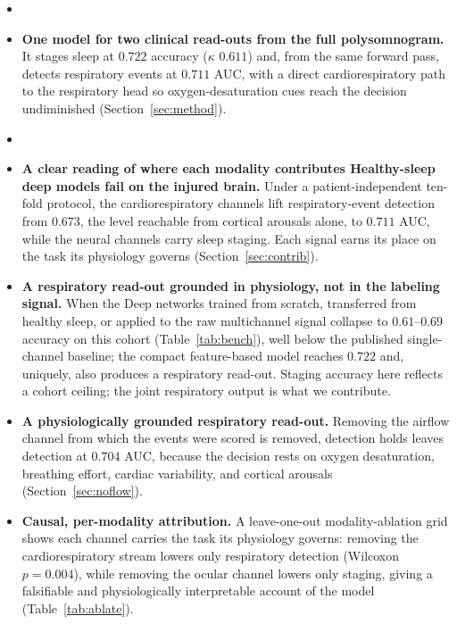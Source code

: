 \documentclass[journal]{IEEEtran}
\newcommand{\mmAcc}{0.722}
\newcommand{\mmK}{0.611}
\newcommand{\mmAuc}{0.711}
\newcommand{\eegAuc}{0.673}
\newcommand{\noflowAuc}{0.704}
\providecommand{\DIFaddtex}[1]{{\protect\color{blue} \sf #1}} %
\providecommand{\DIFdeltex}[1]{{\protect\color{red} \scriptsize #1}} %
\providecommand{\DIFaddbegin}{} %
\providecommand{\DIFaddend}{} %
\providecommand{\DIFdelbegin}{} %
\providecommand{\DIFdelend}{} %
\providecommand{\DIFadd}[1]{\texorpdfstring{\DIFaddtex{#1}}{#1}} %
\providecommand{\DIFdel}[1]{\texorpdfstring{\DIFdeltex{#1}}{}} %
\providecommand{\DIFscaledelfig}{0.5}
\newlength{\DIFdelgraphicswidth} %
\newlength{\DIFdelgraphicsheight} %
\providecommand{\DIFaddincludegraphics}[2][]{{\color{blue}\fbox{\DIFOincludegraphics[#1]{#2}}}} %
\providecommand{\DIFdelincludegraphics}[2][]{%
\sbox{\DIFdelgraphicsbox}{\DIFOincludegraphics[#1]{#2}}%
\settoboxwidth{\DIFdelgraphicswidth}{\DIFdelgraphicsbox} %
\settoboxtotalheight{\DIFdelgraphicsheight}{\DIFdelgraphicsbox} %
\scalebox{\DIFscaledelfig}{%
\parbox[b]{\DIFdelgraphicswidth}{\usebox{\DIFdelgraphicsbox}\\[-\baselineskip] \rule{\DIFdelgraphicswidth}{0em}}\llap{\resizebox{\DIFdelgraphicswidth}{\DIFdelgraphicsheight}{%
\setlength{\unitlength}{\DIFdelgraphicswidth}%
\begin{picture}(1,1)%
\thicklines\linethickness{2pt} %
{\color[rgb]{1,0,0}\put(0,0){\framebox(1,1){}}}%
{\color[rgb]{1,0,0}\put(0,0){\line( 1,1){1}}}%
{\color[rgb]{1,0,0}\put(0,1){\line(1,-1){1}}}%
\end{picture}%
}\hspace*{3pt}}} %
} %
\DeclareRobustCommand{\DIFaddbegin}{\DIFOaddbegin \let\includegraphics\DIFaddincludegraphics} %
\DeclareRobustCommand{\DIFaddend}{\DIFOaddend \let\includegraphics\DIFOincludegraphics} %
\DeclareRobustCommand{\DIFdelbegin}{\DIFOdelbegin \let\includegraphics\DIFdelincludegraphics} %
\DeclareRobustCommand{\DIFdelend}{\DIFOaddend \let\includegraphics\DIFOincludegraphics} %
\begin{document}
\begin{itemize}
\DIFdelbegin %
\item%
\DIFdelend \DIFaddbegin \item[\DIFadd{\textbf{C1.}}] \DIFaddend \textbf{One model for two clinical read-outs from the full polysomnogram.} It stages
sleep at $\mmAcc$ accuracy ($\kappa$ $\mmK$) and, from the same forward pass, detects
respiratory events at $\mmAuc$ AUC, with a direct cardiorespiratory path to the respiratory
head so oxygen-desaturation cues reach the decision undiminished (Section~\ref{sec:method}).
\DIFdelbegin %
\item%
\DIFdelend \DIFaddbegin \item[\DIFadd{\textbf{C2.}}] \DIFaddend \textbf{\DIFdelbegin \DIFdel{A clear reading of where each modality contributes}\DIFdelend \DIFaddbegin \DIFadd{Healthy-sleep deep models fail on the injured brain}\DIFaddend .} \DIFdelbegin \DIFdel{Under a
patient-independent ten-fold protocol, the cardiorespiratory channels lift respiratory-event
detection from
$\eegAuc$, the level reachable from cortical arousals alone, to $\mmAuc$
AUC, while the neural channels carry sleep staging. Each signal earns its place on the task
its physiology governs (Section~\ref{sec:contrib}).
}%
\item%
\DIFdel{\textbf{A respiratory read-out grounded in physiology, not in the labeling signal.}
When the }\DIFdelend \DIFaddbegin \DIFadd{Deep networks trained from
scratch, transferred from healthy sleep, or applied to the raw multichannel signal collapse to
$0.61$--$0.69$ accuracy on this cohort (Table~\ref{tab:bench}), well below the published
single-channel baseline; the compact feature-based model reaches $\mmAcc$ and, uniquely, also
produces a respiratory read-out. Staging accuracy here reflects a cohort ceiling; the joint respiratory output is what we contribute.
}\item[\DIFadd{\textbf{C3.}}] \DIFadd{\textbf{A physiologically grounded respiratory read-out.}
Removing the }\DIFaddend airflow channel from which the events were scored \DIFdelbegin \DIFdel{is removed, detection holds }\DIFdelend \DIFaddbegin \DIFadd{leaves detection }\DIFaddend at
$\noflowAuc$ AUC, because the decision rests on oxygen desaturation, breathing effort,
cardiac variability, and cortical arousals (Section~\ref{sec:noflow}).
\DIFaddbegin \item[\DIFadd{\textbf{C4.}}] \DIFadd{\textbf{Causal, per-modality attribution.} A
leave-one-out modality-ablation grid shows each channel carries the task its physiology governs:
removing the cardiorespiratory stream lowers only respiratory detection (Wilcoxon $p=0.004$),
while removing the ocular channel lowers only staging, giving a falsifiable and physiologically
interpretable account of the model (Table~\ref{tab:ablate}).
}\DIFaddend \end{itemize}
\end{document}
